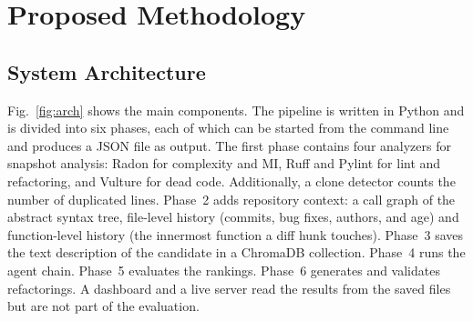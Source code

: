 \documentclass[12pt,onecolumn,draftclsnofoot]{IEEEtran}
\begin{document}
\section{Proposed Methodology}
\label{sec:method}

\subsection{System Architecture}

Fig.~\ref{fig:arch} shows the main components. The pipeline is written in Python and is divided into six phases, each of which can be started from the command line and produces a JSON file as output. The first phase contains four analyzers for snapshot analysis: Radon for complexity and MI, Ruff and Pylint for lint and refactoring, and Vulture for dead code. Additionally, a clone detector counts the number of duplicated lines. Phase~2 adds repository context: a call graph of the abstract syntax tree, file-level history (commits, bug fixes, authors, and age) and function-level history (the innermost function a diff hunk touches). Phase~3 saves the text description of the candidate in a ChromaDB collection. Phase~4 runs the agent chain. Phase~5 evaluates the rankings. Phase~6 generates and validates refactorings. A dashboard and a live server read the results from the saved files but are not part of the evaluation.
\end{document}
